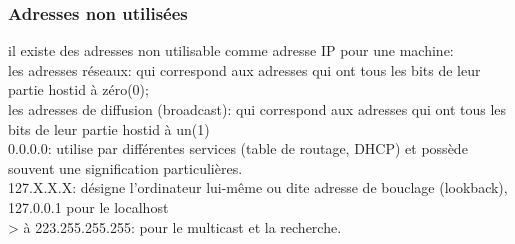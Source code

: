 \subsubsection{Adresses non utilisées}
il existe des adresses non utilisable comme adresse IP pour une machine:\\
les adresses réseaux: qui correspond aux adresses qui ont tous les bits de
leur partie hostid à zéro(0);\\
les adresses de diffusion (broadcast): qui correspond aux adresses qui ont
tous les bits de leur partie hostid à un(1)\\
0.0.0.0: utilise par différentes services (table de routage, DHCP) et possède
souvent une signification particulières. \\
127.X.X.X: désigne l’ordinateur lui-même ou dite adresse de bouclage
(lookback), 127.0.0.1 pour le localhost\\
> à 223.255.255.255: pour le multicast et la recherche.\\


